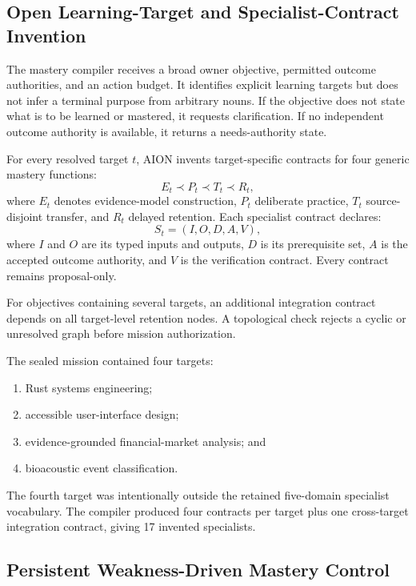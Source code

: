 \subsection{Open Learning-Target and Specialist-Contract Invention}
\label{subsec:open-specialist-contracts}

The mastery compiler receives a broad owner objective, permitted outcome
authorities, and an action budget.  It identifies explicit learning targets but
does not infer a terminal purpose from arbitrary nouns.  If the objective does
not state what is to be learned or mastered, it requests clarification.  If no
independent outcome authority is available, it returns a needs-authority state.

For every resolved target $t$, AION invents target-specific contracts for four
generic mastery functions:
\begin{equation}
E_t \prec P_t \prec T_t \prec R_t,
\label{eq:mastery-contract-chain}
\end{equation}
where $E_t$ denotes evidence-model construction, $P_t$ deliberate practice,
$T_t$ source-disjoint transfer, and $R_t$ delayed retention.  Each specialist
contract declares:
\begin{equation}
S_t=(I,O,D,A,V),
\end{equation}
where $I$ and $O$ are its typed inputs and outputs, $D$ is its prerequisite set,
$A$ is the accepted outcome authority, and $V$ is the verification contract.
Every contract remains proposal-only.

For objectives containing several targets, an additional integration contract
depends on all target-level retention nodes.  A topological check rejects a
cyclic or unresolved graph before mission authorization.

The sealed mission contained four targets:
\begin{enumerate}
    \item Rust systems engineering;
    \item accessible user-interface design;
    \item evidence-grounded financial-market analysis; and
    \item bioacoustic event classification.
\end{enumerate}
The fourth target was intentionally outside the retained five-domain specialist
vocabulary.  The compiler produced four contracts per target plus one
cross-target integration contract, giving 17 invented specialists.

\subsection{Persistent Weakness-Driven Mastery Control}
\label{subsec:persistent-mastery-control}

